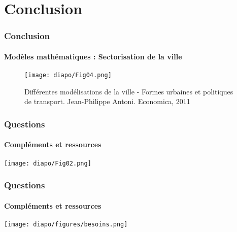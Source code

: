 \section{Conclusion}

\begin{frame}
\frametitle{Conclusion}
\framesubtitle{Modèles mathématiques : Sectorisation de la ville}
\begin{figure}
\texttt{[image: diapo/Fig04.png]}
\caption{Différentes modélisations de la ville - Formes urbaines et politiques de transport. Jean-Philippe Antoni. Economica,
2011}
\end{figure}


\end{frame}



\begin{frame}
    \frametitle{Questions}
    \framesubtitle{Compléments et ressources}
    
\begin{center}
        \texttt{[image: diapo/Fig02.png]}
    \end{center}
\end{frame}


\begin{frame}
    \frametitle{Questions}
    \framesubtitle{Compléments et ressources}
    
\begin{center}
        \texttt{[image: diapo/figures/besoins.png]}
    \end{center}
\end{frame}
